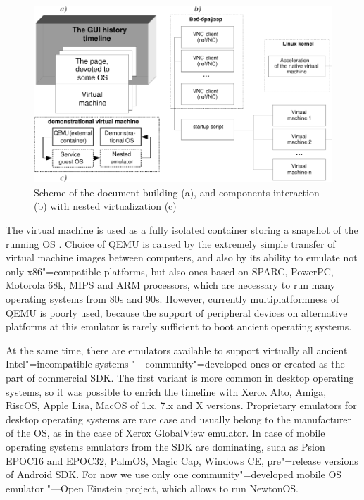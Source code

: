 \documentclass[10pt, a5paper]{article}
\begin{document}
\begin{figure}[h!]
  \centering
  \includegraphics[scale=0.65]{100_2014_w-kostiuk1crop_en}
  \caption{Scheme of the document building (a), and components interaction (b) with nested virtualization (c)}
\end{figure}

The virtual machine is used as a fully isolated container storing a snapshot of the running OS \cite{kostiuk2}. Choice of QEMU is caused by the extremely simple transfer of virtual machine images between computers, and also by its ability to emulate not only x86"=compatible platforms, but also ones based on SPARC, PowerPC, Motorola 68k, MIPS and ARM processors, which are necessary to run many operating systems from 80s and 90s. However, currently multiplatformness of QEMU is poorly used, because the support of peripheral devices on alternative platforms at this emulator is rarely sufficient to boot ancient operating systems.

At the same time, there are emulators available to support virtually all ancient Intel"=incompatible systems "---community"=developed ones or created as the part of commercial SDK. The first variant is more common in desktop operating systems, so it was possible to enrich the timeline with Xerox Alto, Amiga, RiscOS, Apple Lisa, MacOS of 1.x, 7.x and X versions. Proprietary emulators for desktop operating systems are rare case and usually belong to the manufacturer of the OS, as in the case of Xerox GlobalView emulator. In case of mobile operating systems emulators from the SDK are dominating, such as Psion EPOC16 and EPOC32, PalmOS, Magic Cap, Windows CE, pre"=release versions of Android SDK. For now we use only one community"=developed mobile OS emulator "---Open Einstein project, which allows to run NewtonOS.
\end{document}
